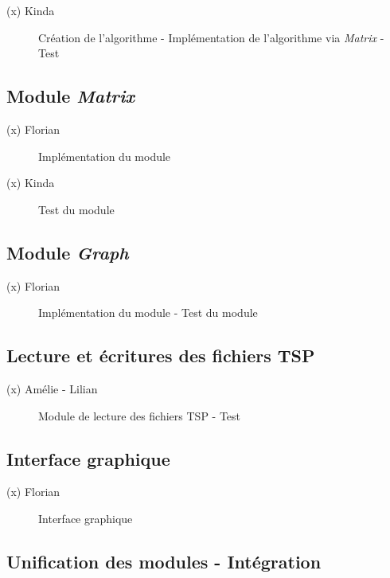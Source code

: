 \begin{description}
	\item[(x) Kinda] Création de l'algorithme - Implémentation de l'algorithme via \textit{Matrix} - Test
\end{description}

\subsection{Module \textit{Matrix}}

\begin{description}
	\item[(x) Florian] Implémentation du module 
	\item[(x) Kinda] Test du module
\end{description}

\subsection{Module \textit{Graph}}

\begin{description}
	\item[(x) Florian] Implémentation du module - Test du module
\end{description}

\subsection{Lecture et écritures des fichiers TSP}

\begin{description}
	\item[(x) Amélie - Lilian] Module de lecture des fichiers TSP - Test
\end{description}

\subsection{Interface graphique}

\begin{description}
	\item [(x) Florian] Interface graphique
\end{description}

\subsection{Unification des modules - Intégration}

